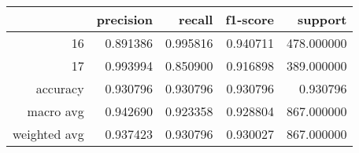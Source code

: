 \begin{tabular}{rrrrr}
\toprule
 & precision & recall & f1-score & support \\
\midrule
16 & 0.891386 & 0.995816 & 0.940711 & 478.000000 \\
17 & 0.993994 & 0.850900 & 0.916898 & 389.000000 \\
accuracy & 0.930796 & 0.930796 & 0.930796 & 0.930796 \\
macro avg & 0.942690 & 0.923358 & 0.928804 & 867.000000 \\
weighted avg & 0.937423 & 0.930796 & 0.930027 & 867.000000 \\
\bottomrule
\end{tabular}
